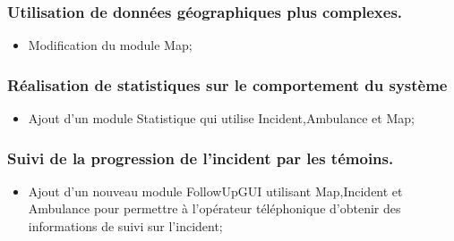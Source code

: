 	\subsubsection{Utilisation de données géographiques plus complexes.}
		\begin{itemize}
			\item Modification du module Map;
		\end{itemize}
	\subsubsection{Réalisation de statistiques sur le comportement du système}
		\begin{itemize}
			\item Ajout d'un module Statistique qui utilise Incident,Ambulance et Map;
		\end{itemize}
	\subsubsection{Suivi de la progression de l'incident par les témoins.}
		\begin{itemize}
			\item Ajout d'un nouveau module FollowUpGUI utilisant Map,Incident et Ambulance
				pour permettre à l'opérateur téléphonique d'obtenir des informations
				de suivi sur l'incident;
		\end{itemize}
		
